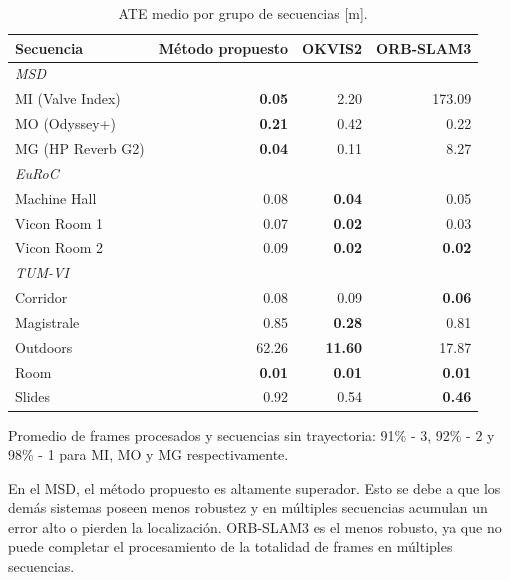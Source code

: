 \begin{table}[ht]
\centering
\caption{ATE medio por grupo de secuencias [m].}
\label{tab:sota_summary}
\begin{threeparttable}
\begin{tabular}{l rrr}
\toprule
\textbf{Secuencia}
& \textbf{Método propuesto} & \textbf{OKVIS2} & \textbf{ORB-SLAM3}\tnote{*} \\
\midrule
\multicolumn{4}{l}{\textit{MSD}} \\
MI (Valve Index)      & \textbf{0.05}  & 2.20           & 173.09          \\
MO (Odyssey+)      & \textbf{0.21}  & 0.42           & 0.22  \\
MG (HP Reverb G2)      & \textbf{0.04}  & 0.11           & 8.27           \\
\midrule
\multicolumn{4}{l}{\textit{EuRoC}} \\
Machine Hall        & 0.08           & \textbf{0.04}  & 0.05           \\
Vicon Room 1        & 0.07           & \textbf{0.02}  & 0.03           \\
Vicon Room 2        & 0.09           & \textbf{0.02}  & \textbf{0.02}  \\
\midrule
\multicolumn{4}{l}{\textit{TUM-VI}} \\
Corridor   & 0.08           & 0.09           & \textbf{0.06}  \\
Magistrale & 0.85           & \textbf{0.28}  & 0.81           \\
Outdoors   & 62.26          & \textbf{11.60} & 17.87          \\
Room       & \textbf{0.01}  & \textbf{0.01}  & \textbf{0.01}  \\
Slides     & 0.92           & 0.54           & \textbf{0.46}  \\
\bottomrule
\end{tabular}
\begin{tablenotes}
  \footnotesize
  \item[*\!] Promedio de frames procesados y secuencias sin trayectoria:
  91\% - 3, 92\% - 2 y 98\% - 1 para MI, MO y MG respectivamente.
\end{tablenotes}
\end{threeparttable}
\end{table}

En el MSD, el método propuesto es altamente superador. Esto se debe a que los demás sistemas poseen menos robustez y en múltiples secuencias acumulan un error alto o pierden la localización.
ORB-SLAM3 es el menos robusto, ya que no puede completar el procesamiento de la totalidad de frames en múltiples secuencias.

